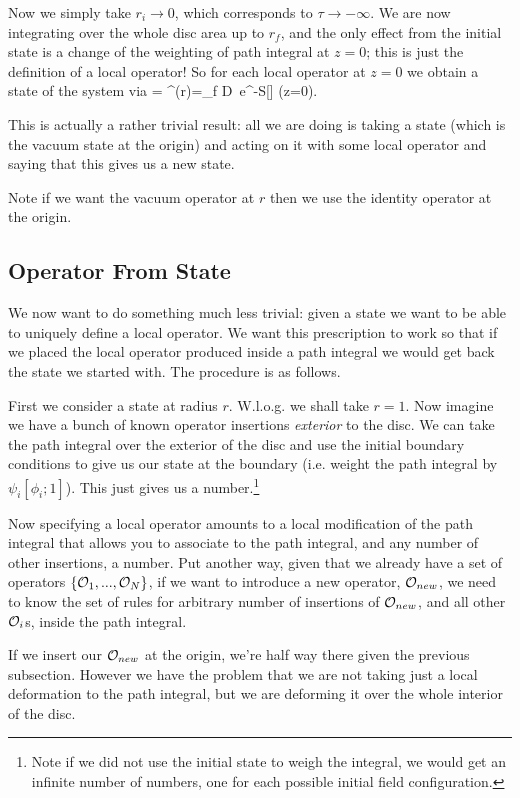 Now we simply take $r_i\to 0$, which corresponds to $\tau \to -\infty$. We are now integrating over the whole disc area up to $r_f$, and the only effect from the initial state is a change of the weighting of path integral at $z=0$; this is just the definition of a local operator! So for each local operator at $z=0$ we obtain a state of the system via 
\bse 
    \psi[\phi_f;r] = \int^{\phi(r)=\phi_f} D\phi \, e^{-S[\phi]} \cO(z=0).
\ese 

This is actually a rather trivial result: all we are doing is taking a state (which is the vacuum state at the origin) and acting on it with some local operator and saying that this gives us a new state. 

\br 
Note if we want the vacuum operator at $r$ then we use the identity operator at the origin.
\er 

\subsection{Operator From State}

We now want to do something much less trivial: given a state we want to be able to uniquely define a local operator. We want this prescription to work so that if we placed the local operator produced inside a path integral we would get back the state we started with. The procedure is as follows.

First we consider a state at radius $r$. W.l.o.g. we shall take $r=1$. Now imagine we have a bunch of known operator insertions \textit{exterior} to the disc. We can take the path integral over the exterior of the disc and use the initial boundary conditions to give us our state at the boundary (i.e. weight the path integral by $\psi_i[\phi_i;1]$). This just gives us a number.\footnote{Note if we did not use the initial state to weigh the integral, we would get an infinite number of numbers, one for each possible initial field configuration.}

Now specifying a local operator amounts to a local modification of the path integral that allows you to associate to the path integral, and any number of other insertions, a number. Put another way, given that we already have a set of operators $\{\mathcal{O}_1,...,\mathcal{O}_N\}$, if we want to introduce a new operator, $\mathcal{O}_{new}$, we need to know the set of rules for arbitrary number of insertions of $\mathcal{O}_{new}$, and all other $\mathcal{O}_i$s, inside the path integral. 

If we insert our $\mathcal{O}_{new}$ at the origin, we're half way there given the previous subsection. However we have the problem that we are not taking just a local deformation to the path integral, but we are deforming it over the whole interior of the disc. 

